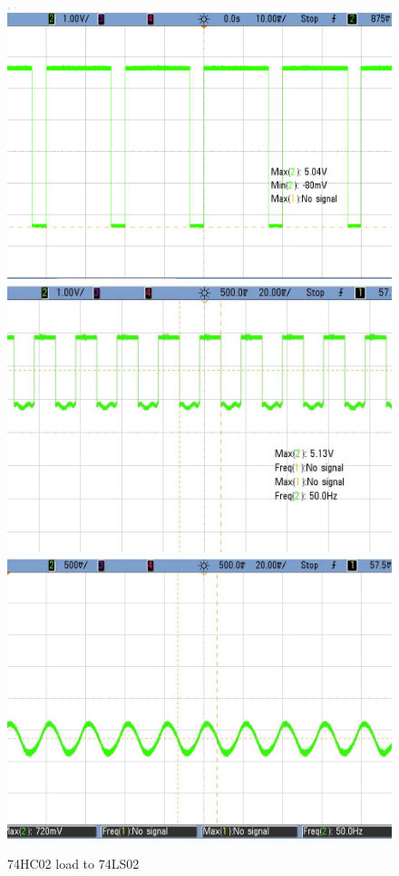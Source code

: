 \begin{figure}[h!]
        \centering
        \includegraphics[scale=0.19]{cmos_cerda2.png}\hspace{1cm}
        \includegraphics[scale=0.2]{cmos_dads.jpeg}\\
		\vspace{0.2cm}
	   \includegraphics[scale=0.19]{cmos_ahifdas.jpeg} 
        \caption{\color{cyan}74HC02 load to 74LS02}
        \label{fig:ej2exhctols}
    \end{figure}


